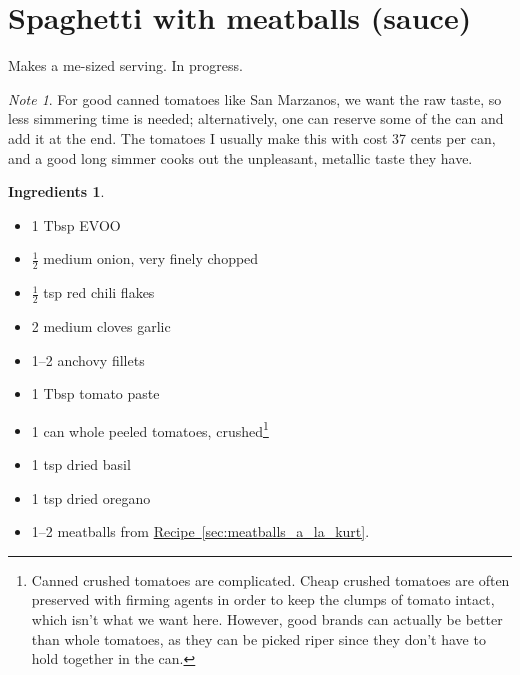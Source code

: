 \documentclass[a4paper,12pt]{scrreprt}
\theoremstyle{definition}
\newtheorem*{ingredients}{Ingredients}
\theoremstyle{plain}
\theoremstyle{remark}
\newtheorem{note}{Note}[section]
\begin{document}
\section{Spaghetti with meatballs (sauce)}
Makes a me-sized serving. In progress.
\begin{note}
  For good canned tomatoes like San Marzanos, we want the raw taste, so less simmering time is needed; alternatively, one can reserve some of the can and add it at the end. The tomatoes I usually make this with cost 37 cents per can, and a good long simmer cooks out the unpleasant, metallic taste they have.
\end{note}
\begin{ingredients}
  $\,$
  \begin{multicols}{2}
    \begin{itemize}
      \item 1 Tbsp EVOO

      \item $\frac{1}{2}$ medium onion, very finely chopped

      \item $\frac{1}{2}$ tsp red chili flakes

      \item 2 medium cloves garlic

      \item 1--2 anchovy fillets

      \item 1 Tbsp tomato paste

      \item 1 can whole peeled tomatoes, crushed\footnote{Canned crushed tomatoes are complicated. Cheap crushed tomatoes are often preserved with firming agents in order to keep the clumps of tomato intact, which isn't what we want here. However, good brands can actually be better than whole tomatoes, as they can be picked riper since they don't have to hold together in the can.}

      \item 1 tsp dried basil

      \item 1 tsp dried oregano

      \item 1--2 meatballs from \hyperref[sec:meatballs_a_la_kurt]{Recipe~\ref*{sec:meatballs_a_la_kurt}}.
    \end{itemize}
  \end{multicols}
\end{ingredients}
\end{document}
